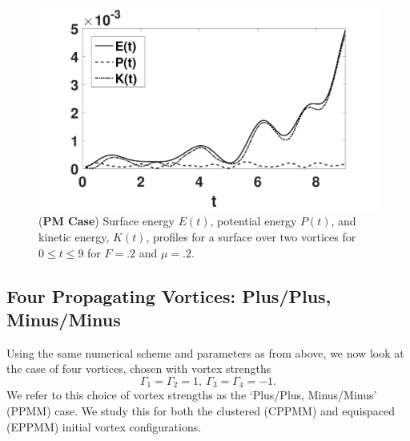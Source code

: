 \documentclass[a4paper,11pt]{article}
\begin{document}
\begin{figure}[!h]
\centering
\includegraphics[width=.6\textwidth]{energy_profile_mu_pt2_F_pt2_tv}
\caption{\small ({\bf PM Case}) Surface energy $E(t)$, potential energy $P(t)$, and kinetic energy, $K(t)$, profiles for a surface over two vortices for $0\leq t \leq 9$ for $F=.2$ and $\mu=.2$.}
\label{fig:eprof_tv}
\end{figure}

\subsection{Four Propagating Vortices: Plus/Plus, Minus/Minus}
Using the same numerical scheme and parameters as from above, we now look at the case of four vortices, chosen with vortex strengths
\[
\Gamma_{1}=\Gamma_{2}=1, ~ \Gamma_{3}=\Gamma_{4}=-1.
\]
We refer to this choice of vortex strengths as the `Plus/Plus, Minus/Minus' (PPMM) case.  We study this for both the clustered (CPPMM) and equispaced (EPPMM) initial vortex configurations.  
\end{document}
